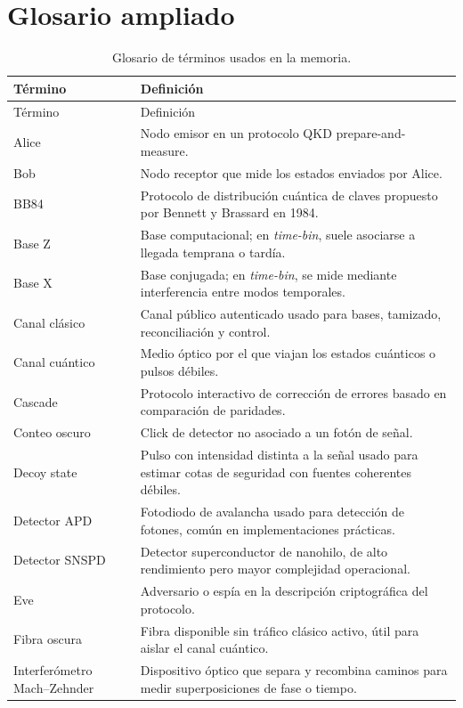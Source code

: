 \chapter{Glosario ampliado}
\label{app:glosario}

\begin{longtable}{p{}p{}}
  \caption{Glosario de términos usados en la memoria.}
  \label{tab:glosario}\\
  \toprule
  Término & Definición \\
  \midrule
  \endfirsthead
  \toprule
  Término & Definición \\
  \midrule
  \endhead
  Alice & Nodo emisor en un protocolo QKD prepare-and-measure. \\
  Bob & Nodo receptor que mide los estados enviados por Alice. \\
  BB84 & Protocolo de distribución cuántica de claves propuesto por Bennett y Brassard en 1984. \\
  Base Z & Base computacional; en \textit{time-bin}, suele asociarse a llegada temprana o tardía. \\
  Base X & Base conjugada; en \textit{time-bin}, se mide mediante interferencia entre modos temporales. \\
  Canal clásico & Canal público autenticado usado para bases, tamizado, reconciliación y control. \\
  Canal cuántico & Medio óptico por el que viajan los estados cuánticos o pulsos débiles. \\
  Cascade & Protocolo interactivo de corrección de errores basado en comparación de paridades. \\
  Conteo oscuro & Click de detector no asociado a un fotón de señal. \\
  Decoy state & Pulso con intensidad distinta a la señal usado para estimar cotas de seguridad con fuentes coherentes débiles. \\
  Detector APD & Fotodiodo de avalancha usado para detección de fotones, común en implementaciones prácticas. \\
  Detector SNSPD & Detector superconductor de nanohilo, de alto rendimiento pero mayor complejidad operacional. \\
  Eve & Adversario o espía en la descripción criptográfica del protocolo. \\
  Fibra oscura & Fibra disponible sin tráfico clásico activo, útil para aislar el canal cuántico. \\
  Interferómetro Mach--Zehnder & Dispositivo óptico que separa y recombina caminos para medir superposiciones de fase o tiempo. \\

\end{longtable}
